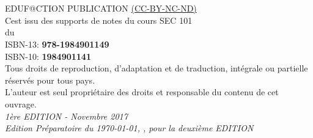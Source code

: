
\newpage

~\vfill
\thispagestyle{empty}

\noindent {\Huge\ccbyncndeu}\\ 

 EDUF@CTION PUBLICATION \href{https://creativecommons.org/licenses/by-nc-nd/2.0/fr/}{(CC-BY-NC-ND)}\\ %

\noindent C\edoc est issu des supports de notes du cours SEC 101\\ 
du \uCnam \\

\noindent ISBN-13: \textbf{978-1984901149} \\

\noindent ISBN-10: \textbf{1984901141} \\

\noindent Tous droits de reproduction, d’adaptation et de traduction, intégrale ou partielle réservés pour tous pays.\\

\noindent L’auteur est seul propriétaire des droits et responsable du contenu de cet ouvrage.\\

\noindent \textit{1ère EDITION - Novembre 2017} \\
\noindent \textit{Edition Préparatoire du  \today, \printer, pour la deuxième EDITION} %